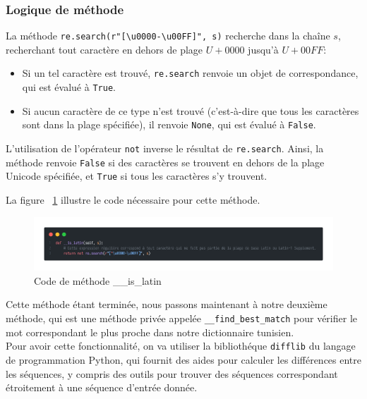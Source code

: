 \subsubsection{Logique de méthode}
\noindent
La méthode \texttt{re.search(r"[\textbackslash u0000-\textbackslash u00FF]", s)} recherche dans la chaîne \( s \), recherchant tout caractère en dehors de plage \( U+0000 \) jusqu'à \( U+00FF \):
\begin{itemize}
	\item Si un tel caractère est trouvé, \texttt{re.search} renvoie un objet de correspondance, qui est évalué à \texttt{True}.
	\item Si aucun caractère de ce type n'est trouvé (c'est-à-dire que tous les caractères sont dans la plage spécifiée), il renvoie \texttt{None}, qui est évalué à \texttt{False}.
\end{itemize}
L'utilisation de l'opérateur \texttt{not} inverse le résultat de \texttt{re.search}. Ainsi, la méthode renvoie \texttt{False} si des caractères se trouvent en dehors de la plage Unicode spécifiée, et \texttt{True} si tous les caractères s'y trouvent.

\noindent
La figure ~\ref{fig:islatin} illustre le code nécessaire pour cette méthode.

\begin{figure}[H]
	\centering
	\includegraphics[width=1\textwidth]{logos/islatin.png}
	\caption{Code de méthode \_\_is\_latin}
	\label{fig:islatin}
\end{figure}

\noindent
Cette méthode étant terminée, nous passons maintenant à notre deuxième méthode, qui est une méthode privée appelée \texttt{\_\_find\_best\_match} pour vérifier le mot correspondant le plus proche dans notre dictionnaire tunisien. \\
Pour avoir cette fonctionnalité, on va utiliser la bibliothéque \texttt{difflib} du langage de programmation Python, qui fournit des aides pour calculer les différences entre les séquences, y compris des outils pour trouver des séquences correspondant étroitement à une séquence d'entrée donnée.

